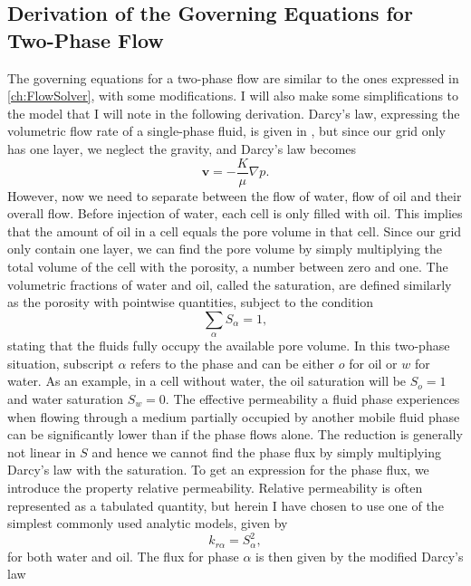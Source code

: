 \subsection{Derivation of the Governing Equations for Two-Phase Flow}
The governing equations for a two-phase flow are similar to the ones expressed in \autoref{ch:FlowSolver}, with some modifications. I will also make some simplifications to the model that I will note in the following derivation. Darcy's law, expressing the volumetric flow rate of a single-phase fluid, is given in , but since our grid only has one layer, we neglect the gravity, and Darcy's law becomes
\begin{equation*}
    \textbf{v} = - \frac{K}{\mu}\nabla p.
    \label{eq:DarcyNoGravity}
\end{equation*}
However, now we need to separate between the flow of water, flow of oil and their overall flow. Before injection of water, each cell is only filled with oil. This implies that the amount of oil in a cell equals the pore volume in that cell. Since our grid only contain one layer, we can find the pore volume by simply multiplying the total volume of the cell with the porosity, a number between zero and one. The volumetric fractions of water and oil, called the saturation, are defined similarly as the porosity with pointwise quantities, subject to the condition
\begin{equation*}
\sum_\alpha S_\alpha = 1,
\end{equation*}
stating that the fluids fully occupy the available pore volume. In this two-phase situation, subscript $\alpha$ refers to the phase and can be either $o$ for oil or $w$ for water. As an example, in a cell without water, the oil saturation will be $S_o = 1$ and water saturation $S_w = 0$.  The effective permeability a fluid phase experiences when flowing through a medium partially occupied by another mobile fluid phase can be significantly lower than if the phase flows alone. The reduction is generally not linear in $S$ and hence we cannot find the phase flux by simply multiplying Darcy's law with the saturation. To get an expression for the phase flux, we introduce the property relative permeability. Relative permeability is often represented as a tabulated quantity, but herein I have chosen to use one of the simplest commonly used analytic models, given by
\begin{equation*}
k_{r\alpha} = S_\alpha^2,
\end{equation*}
for both water and oil. The flux for phase $\alpha$ is then given by the modified Darcy's law
